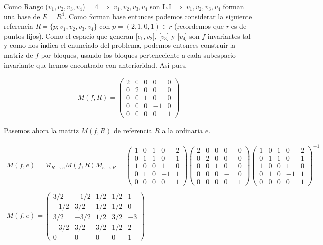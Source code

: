Como Rango ($v_1,v_2,v_3,v_4$) = 4 $\Longrightarrow$ $v_1,v_2,v_3,v_4$ son L.I $\Longrightarrow$ $v_1,v_2,v_3,v_4$ forman una base de $E = R^4$. Como forman base entonces podemos considerar la siguiente referencia $R = \{p; v_1,v_2,v_3,v_4\}$ con $p = (2,1,0,1) \in r$ (recordemos que $r$ es de puntos fijos). Como el espacio que generan [$v_1,v_2$], [$v_3$] y [$v_4$] son $f$-invariantes tal y como nos indica el enunciado del problema, podemos entonces construir la matriz de $f$ por bloques, usando los bloques perteneciente a cada subespacio invariante que hemos encontrado con anterioridad. Así pues,

\begin{gather*}
    M(f, R) = 
    \begin{pmatrix}
    2 & 0 & 0 & 0 & 0\\
    0 & 2 & 0 & 0 & 0\\
    0 & 0 & 1 & 0 & 0\\
    0 & 0 & 0 & -1 & 0\\
    0 & 0 & 0 & 0 & 1
    \end{pmatrix}
\end{gather*}
\vspace{3mm}

Pasemos ahora la matriz $M(f, R)$ de referencia $R$ a la ordinaria $e$.

\begin{gather*}
    M(f, e) = M_{R \rightarrow e} M(f, R) M_{e \rightarrow R} =
    \begin{pmatrix}
    1 & 0 & 1 & 0 & 2\\
    0 & 1 & 1 & 0 & 1\\
    1 & 0 & 0 & 1 & 0\\
    0 & 1 & 0 & -1 & 1\\
    0 & 0 & 0 & 0 & 1
    \end{pmatrix}
    \begin{pmatrix}
    2 & 0 & 0 & 0 & 0\\
    0 & 2 & 0 & 0 & 0\\
    0 & 0 & 1 & 0 & 0\\
    0 & 0 & 0 & -1 & 0\\
    0 & 0 & 0 & 0 & 1
    \end{pmatrix}
    \begin{pmatrix}
    1 & 0 & 1 & 0 & 2\\
    0 & 1 & 1 & 0 & 1\\
    1 & 0 & 0 & 1 & 0\\
    0 & 1 & 0 & -1 & 1\\
    0 & 0 & 0 & 0 & 1
    \end{pmatrix}^{-1}
    \\ 
    \\
    M(f, e) = 
    \begin{pmatrix}
    3/2 & -1/2 & 1/2 & 1/2 & 1\\
    -1/2 & 3/2 & 1/2 & 1/2 & 0\\
    3/2 & -3/2 & 1/2 & 3/2 & -3\\
    -3/2 & 3/2 & 3/2 & 1/2 & 2\\
    0 & 0 & 0 & 0 & 1
    \end{pmatrix}
\end{gather*}

